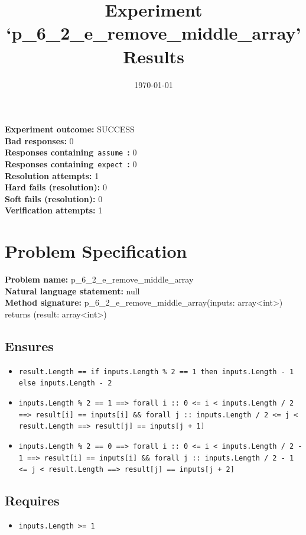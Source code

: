 \documentclass{article}
\begin{document}
\title{Experiment `p\_6\_2\_e\_remove\_middle\_array' Results}
\author{\today}
\date{}
\maketitle
\textbf{Experiment outcome: }SUCCESS
\\\textbf{Bad responses: }0
\\\textbf{Responses containing}~\texttt{assume}~\textbf{: }0
\\\textbf{Responses containing}~\texttt{expect}~\textbf{: }0
\\\textbf{Resolution attempts: }1
\\\textbf{Hard fails (resolution): }0
\\\textbf{Soft fails (resolution): }0
\\\textbf{Verification attempts: }1
\section*{Problem Specification}
\textbf{Problem name: }p\_6\_2\_e\_remove\_middle\_array
\\\textbf{Natural language statement: }null
\\\textbf{Method signature: }p\_6\_2\_e\_remove\_middle\_array(inputs: array<int>) returns (result: array<int>)
\subsection*{Ensures}
\begin{itemize}
\item \texttt{result.Length == if inputs.Length \% 2 == 1 then inputs.Length - 1 else inputs.Length - 2}
\item \texttt{inputs.Length \% 2 == 1 ==> forall i :: 0 <= i < inputs.Length / 2 ==> result[i] == inputs[i] \&\& forall j :: inputs.Length / 2 <= j < result.Length ==> result[j] == inputs[j + 1]}
\item \texttt{inputs.Length \% 2 == 0 ==> forall i :: 0 <= i < inputs.Length / 2 - 1 ==> result[i] == inputs[i] \&\& forall j :: inputs.Length / 2 - 1 <= j < result.Length ==> result[j] == inputs[j + 2]}
\end{itemize}
\subsection*{Requires}
\begin{itemize}
\item \texttt{inputs.Length >= 1}
\end{itemize}
\clearpage
\end{document}
